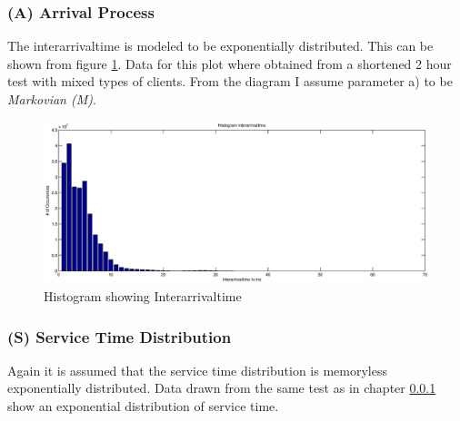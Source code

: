 \documentclass[a4paper]{article}
\begin{document}
\subsubsection{(A) Arrival Process}
\label{subsub:ArrivalProcess}

The interarrivaltime is modeled to be exponentially distributed. This can be shown from figure \ref{fig:interarrivaltime}. Data for this plot where obtained from a shortened 2 hour test with mixed types of clients. From the diagram I assume parameter a) to be \textit{Markovian (M)}.



\begin{figure}[H]
	\begin{center}
    \includegraphics[scale=0.6]{../plots-ms2-mg/interarrivaltime.eps}
  \end{center}
  \caption{Histogram showing Interarrivaltime}
  \label{fig:interarrivaltime}
\end{figure}



\subsubsection{(S) Service Time Distribution }

Again it is assumed that the service time distribution is memoryless exponentially distributed. Data drawn from the same test as in chapter \ref{subsub:ArrivalProcess} show an exponential distribution of service time.

\end{document}
